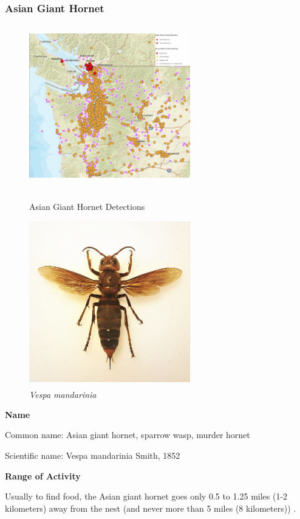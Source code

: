 \documentclass[12pt]{article}
\newcommand{\upcite}[1]{\textsuperscript{\textsuperscript{\cite{#1}}}}
\begin{document}
\subsubsection{Asian Giant Hornet  }
\begin{figure}[!htbp]
	\small
	\centering
	\begin{minipage}{8cm}
		\includegraphics[width=7cm,height=7cm]{./pictures/dist0.png}
		\caption{ Asian Giant Hornet Detections\upcite{website}}\label{nt}
	\end{minipage}
	\begin{minipage}{8cm}
		\includegraphics[width=7cm,height=7cm]{./pictures/wikiintro.jpg}
		\caption{\emph{Vespa mandarinia}\upcite{wiki}}\label{nt}
	\end{minipage}
	
\end{figure}

\textbf{Name}

Common name:  Asian giant hornet, sparrow wasp, murder hornet

Scientific name: Vespa mandarinia Smith, 1852

\textbf{Range of Activity }

Usually to find food, the Asian giant hornet goes only 0.5 to 1.25 miles (1-2 kilometers) away from the nest (and never more than 5 miles (8 kilometers)) .
\end{document}
